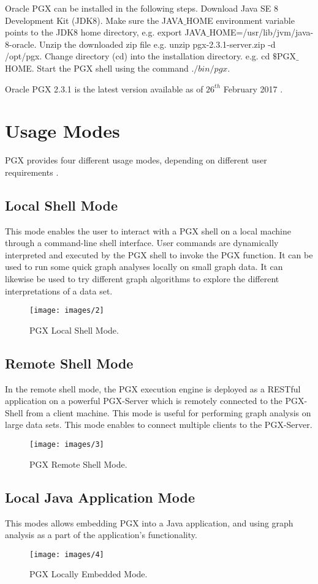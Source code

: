 \documentclass[9pt,twocolumn,twoside]{styles/osajnl}
\begin{document}
Oracle PGX can be installed in the following steps. Download Java SE 8
Development Kit (JDK8). Make sure the JAVA$\_$HOME environment
variable points to the JDK8 home directory, e.g. export
JAVA$\_$HOME=/usr/lib/jvm/java-8-oracle. Unzip the downloaded zip file
e.g. unzip pgx-2.3.1-server.zip -d /opt/pgx. Change directory (cd)
into the installation directory. e.g. cd $\$$PGX$\_$HOME. Start the
PGX shell using the command $./bin/pgx$.

Oracle PGX 2.3.1 is the latest version available as of $26^{th}$
February 2017 \cite{www-plat}.


\section{Usage Modes}
PGX provides four different usage modes, depending on different user
requirements \cite{www-usage}.

\subsection{Local Shell Mode}
This mode enables the user to interact with a PGX shell on a local
machine through a command-line shell interface. User commands are
dynamically interpreted and executed by the PGX shell to invoke the
PGX function. It can be used to run some quick graph analyses locally
on small graph data. It can likewise be used to try different graph
algorithms to explore the different interpretations of a data set.
    \begin{figure}[h]
    \centering \texttt{[image: images/2]} \centering
    \caption{PGX Local Shell Mode.}
    \end{figure}
    
\subsection{Remote Shell Mode}
In the remote shell mode, the PGX execution engine is deployed as a
RESTful application on a powerful PGX-Server which is remotely
connected to the PGX-Shell from a client machine. This mode is useful
for performing graph analysis on large data sets. This mode enables to
connect multiple clients to the PGX-Server.
    \begin{figure}[h]
    \centering \texttt{[image: images/3]} \centering
    \caption{PGX Remote Shell Mode.}
    \end{figure}
    
\subsection{Local Java Application Mode}
This modes allows embedding PGX into a Java application, and using
graph analysis as a part of the application’s functionality.
    \begin{figure}[h]
    \centering \texttt{[image: images/4]} \centering
    \caption{PGX Locally Embedded Mode.}
    \end{figure}
    
\end{document}
